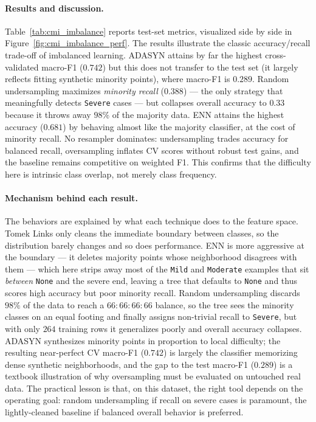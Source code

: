 \paragraph{Results and discussion.} Table~\ref{tab:cmi_imbalance} reports test-set metrics, visualized side by side in Figure~\ref{fig:cmi_imbalance_perf}. The results illustrate the classic accuracy/recall trade-off of imbalanced learning. ADASYN attains by far the highest cross-validated macro-F1 ($0.742$) but this does not transfer to the test set (it largely reflects fitting synthetic minority points), where macro-F1 is $0.289$. Random undersampling maximizes \emph{minority recall} ($0.388$) --- the only strategy that meaningfully detects \texttt{Severe} cases --- but collapses overall accuracy to $0.33$ because it throws away $98\%$ of the majority data. ENN attains the highest accuracy ($0.681$) by behaving almost like the majority classifier, at the cost of minority recall. No resampler dominates: undersampling trades accuracy for balanced recall, oversampling inflates CV scores without robust test gains, and the baseline remains competitive on weighted F1. This confirms that the difficulty here is intrinsic class overlap, not merely class frequency.\\

\paragraph{Mechanism behind each result.} The behaviors are explained by what each technique does to the feature space. Tomek Links only cleans the immediate boundary between classes, so the distribution barely changes and so does performance. ENN is more aggressive at the boundary --- it deletes majority points whose neighborhood disagrees with them --- which here strips away most of the \texttt{Mild} and \texttt{Moderate} examples that sit \emph{between} \texttt{None} and the severe end, leaving a tree that defaults to \texttt{None} and thus scores high accuracy but poor minority recall. Random undersampling discards $98\%$ of the data to reach a $66{:}66{:}66{:}66$ balance, so the tree sees the minority classes on an equal footing and finally assigns non-trivial recall to \texttt{Severe}, but with only $264$ training rows it generalizes poorly and overall accuracy collapses. ADASYN synthesizes minority points in proportion to local difficulty; the resulting near-perfect CV macro-F1 ($0.742$) is largely the classifier memorizing dense synthetic neighborhoods, and the gap to the test macro-F1 ($0.289$) is a textbook illustration of why oversampling must be evaluated on untouched real data. The practical lesson is that, on this dataset, the right tool depends on the operating goal: random undersampling if recall on severe cases is paramount, the lightly-cleaned baseline if balanced overall behavior is preferred.

